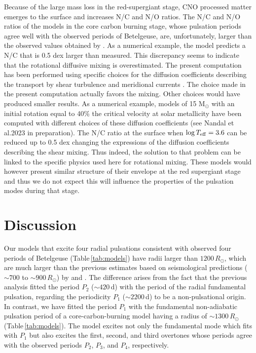 \documentclass[fleqn,usenatbib]{mnras}
\begin{document}
Because of the large mass loss in the red-supergiant stage, CNO processed
matter emerges to the surface and increases N/C and N/O ratios.
The N/C and N/O ratios of the models in the core carbon burning stage, 
whose pulsation periods agree well with the observed periods of Betelgeuse, 
are, unfortunately, larger than the observed values obtained by \citet{Carr2000}.
As a numerical example, the model predicts a N/C that is 0.5 dex
larger than measured.
This discrepancy seems to indicate that the rotational diffusive mixing is 
overestimated.
The present computation has been performed using specific choices for the
diffusion coefficients describing the transport by shear turbulence and meridional currents \citep[see references in][]{Ekstroem2012}. The choice made in the present computation actually favors the mixing.
Other choices would have produced smaller results. As a numerical example, models of 15 M$_\odot$ with an initial rotation equal to 40\% the critical velocity at solar metallicity have been computed with different choices of these diffusion coefficients (see Nandal et al.2023 in preparation). The N/C ratio at the surface when 
$\log T_{\rm eff} =3.6$  can be reduced up to 0.5 dex changing the expressions of the diffusion coefficients describing the shear mixing. Thus indeed, the solution to that problem can be linked to the specific physics used here for rotational mixing. 
These models would however present similar structure of their envelope at the red supergiant stage and thus we do not expect this will influence the properties of the pulsation modes during that stage.



\section{Discussion}
Our models that excite four radial pulsations consistent with 
observed four periods of Betelgeuse (Table\,\ref{tab:models}) have radii larger 
than $1200\,R_\odot$, which are much larger than the previous 
estimates based on 
seismological predictions ($\sim700$ to $\sim 900\,R_\odot$) 
by \citet{Joyce2020} and \citet{Dolan2016}. 
The difference arises from the fact that the previous analysis fitted 
the period $P_2$ ($\sim420$\,d) with the period of the radial fundamental 
pulsation, regarding the periodicity 
$P_1$ ($\sim2200$\,d) to be a non-pulsational origin.   
In contrast, we have fitted the period $P_1$ with the fundamental non-adiabatic
pulsation period of a core-carbon-burning model having a radius of 
$\sim1300\,R_\odot$ (Table\,\ref{tab:models}).
The model excites not only the fundamental mode which fits with $P_1$ but also
excites the first, second, and third overtones whose periods agree with
the observed periods $P_2$, $P_3$, and $P_4$, respectively.
\end{document}
